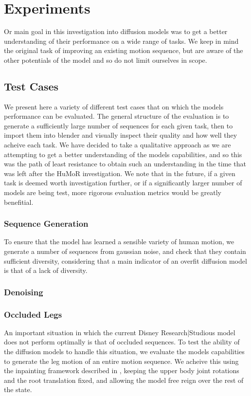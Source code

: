 \section{Experiments}
\label{sec:experiments}

Or main goal in this investigation into diffusion models was to get a better understanding of their performance on a wide range of tasks. We keep in mind the original task of improving an existing motion sequence, but are aware of the other potentials of the model and so do not limit ourselves in scope.


\subsection{Test Cases}
We present here a variety of different test cases that on which the models performance can be evaluated. The general structure of the evaluation is to generate a sufficiently large number of sequences for each given task, then to import them into blender and visually inspect their quality and how well they acheive each task. We have decided to take a qualitative approach as we are attempting to get a better understanding of the models capabilities, and so this was the path of least resistance to obtain such an understanding in the time that was left after the HuMoR investigation. We note that in the future, if a given task is deemed worth investigation further, or if a significantly larger number of models are being test, more rigorous evaluation metrics would be greatly benefitial.

\subsubsection{Sequence Generation}
To ensure that the model has learned a sensible variety of human motion, we generate a number of sequences from gaussian noise, and check that they contain sufficient diversity, considering that a main indicator of an overfit diffusion model is that of a lack of diversity.

\subsubsection{Denoising}

\subsubsection{Occluded Legs}
An important situation in which the current Disney Research|Studious model does not perform optimally is that of occluded sequences. To test the ability of the diffusion models to handle this situation, we evaluate the models capabilities to generate the leg motion of an entire motion sequence. We acheive this using the inpainting framework described in , keeping the upper body joint rotations and the root translation fixed, and allowing the model free reign over the rest of the state.

